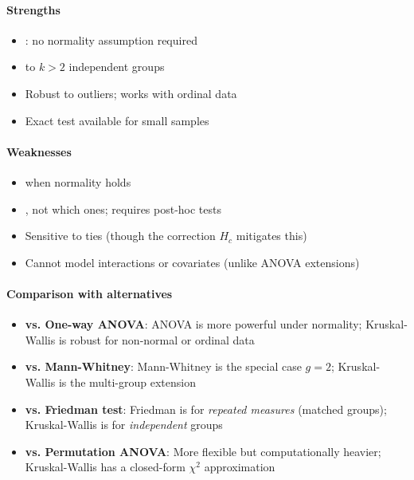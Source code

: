 \paragraph{Strengths}
\begin{itemize}
    \item {}: no normality assumption required
    \item {} to $k > 2$ independent groups
    \item Robust to outliers; works with ordinal data
    \item Exact test available for small samples
\end{itemize}

\paragraph{Weaknesses}
\begin{itemize}
    \item {} when normality holds
    \item {}, not which ones; requires post-hoc tests
    \item Sensitive to ties (though the correction $H_c$ mitigates this)
    \item Cannot model interactions or covariates (unlike ANOVA extensions)
\end{itemize}

\paragraph{Comparison with alternatives}
\begin{itemize}
    \item \textbf{vs. One-way ANOVA}: ANOVA is more powerful under normality;
        Kruskal-Wallis is robust for non-normal or ordinal data
    \item \textbf{vs. Mann-Whitney}: Mann-Whitney is the special case $g = 2$;
        Kruskal-Wallis is the multi-group extension
    \item \textbf{vs. Friedman test}: Friedman is for \emph{repeated measures} (matched
        groups); Kruskal-Wallis is for \emph{independent} groups
    \item \textbf{vs. Permutation ANOVA}: More flexible but computationally heavier;
        Kruskal-Wallis has a closed-form $\chi^2$ approximation
\end{itemize}


